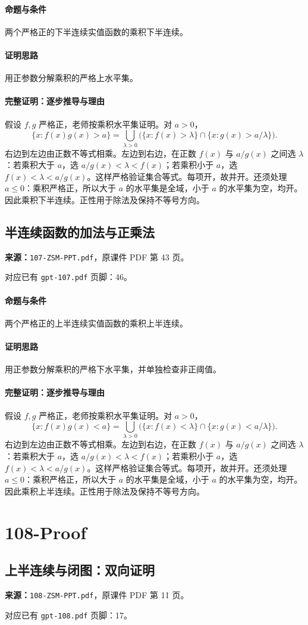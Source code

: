 \paragraph{命题与条件}两个严格正的下半连续实值函数的乘积下半连续。
\paragraph{证明思路}用正参数分解乘积的严格上水平集。
\paragraph{完整证明：逐步推导与理由}
假设 $f,g$ 严格正，老师按乘积水平集证明。对 $a>0$，
\[\{x:f(x)g(x)>a\}=\bigcup_{\lambda>0}\big(\{x:f(x)>\lambda\}\cap\{x:g(x)>a/\lambda\}\big).\]
右边到左边由正数不等式相乘。左边到右边，在正数 $f(x)$ 与 $a/g(x)$ 之间选 $\lambda$：若乘积大于 $a$，选 $a/g(x)<\lambda<f(x)$；若乘积小于 $a$，选 $f(x)<\lambda<a/g(x)$。这样严格验证集合等式。每项开，故并开。还须处理 $a\le0$：乘积严格正，所以大于 $a$ 的水平集是全域，小于 $a$ 的水平集为空，均开。因此乘积下半连续。正性用于除法及保持不等号方向。
\clearpage\subsection{半连续函数的加法与正乘法}
\textbf{来源：}\texttt{107-ZSM-PPT.pdf}，原课件 PDF 第 43 页。\par
对应已有 \texttt{gpt-107.pdf} 页脚：46。\par
\paragraph{命题与条件}两个严格正的上半连续实值函数的乘积上半连续。
\paragraph{证明思路}用正参数分解乘积的严格下水平集，并单独检查非正阈值。
\paragraph{完整证明：逐步推导与理由}
假设 $f,g$ 严格正，老师按乘积水平集证明。对 $a>0$，
\[\{x:f(x)g(x)<a\}=\bigcup_{\lambda>0}\big(\{x:f(x)<\lambda\}\cap\{x:g(x)<a/\lambda\}\big).\]
右边到左边由正数不等式相乘。左边到右边，在正数 $f(x)$ 与 $a/g(x)$ 之间选 $\lambda$：若乘积大于 $a$，选 $a/g(x)<\lambda<f(x)$；若乘积小于 $a$，选 $f(x)<\lambda<a/g(x)$。这样严格验证集合等式。每项开，故并开。还须处理 $a\le0$：乘积严格正，所以大于 $a$ 的水平集是全域，小于 $a$ 的水平集为空，均开。因此乘积上半连续。正性用于除法及保持不等号方向。
\clearpage\section{108-Proof}
\clearpage\subsection{上半连续与闭图：双向证明}
\textbf{来源：}\texttt{108-ZSM-PPT.pdf}，原课件 PDF 第 11 页。\par
对应已有 \texttt{gpt-108.pdf} 页脚：17。\par
